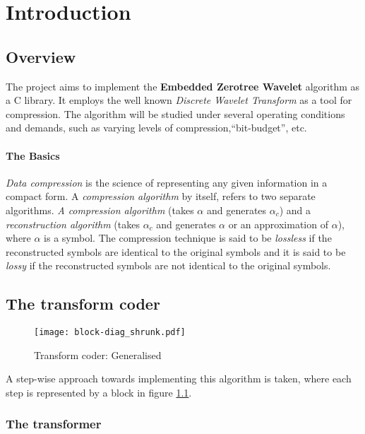 \documentclass[./A14_Report.tex]{subfiles}
\begin{document}
\chapter{Introduction}
\section{Overview}
\label{sec:overview}

The project aims to implement the \textbf{Embedded Zerotree Wavelet} algorithm
as a C library. It employs the well known \textit{Discrete Wavelet Transform}
as a tool for compression. The algorithm will be studied under several
operating conditions and demands, such as varying levels of
compression,``bit-budget'', etc.

\subsubsection{The Basics}%
\label{sec:the_basics}

\textit{Data compression} is the science of representing any given information
in a compact form. A \textit{compression algorithm} by itself, refers to two
separate algorithms. \textit{A compression algorithm} (takes $\alpha$ and
generates $\alpha_c$) and a \textit{reconstruction algorithm} (takes $\alpha_c$
and generates $\alpha$ or an approximation of $\alpha$), where $\alpha$ is a
symbol. The compression technique is said to be \textit{lossless} if the
reconstructed symbols are identical to the original symbols and it is said to
be \textit{lossy} if the  reconstructed symbols are not identical to the
original symbols.

\section{The transform coder}
\label{sec:the_transform_coder}

\begin{figure}[h]
    \centering
    \texttt{[image: block-diag\_shrunk.pdf]}
    \caption{Transform coder: Generalised \cite{shap1993}}
    \label{fig:tcoder}
\end{figure}

A step-wise approach towards implementing this algorithm is taken, where each
step is represented by a block in figure \ref{fig:tcoder}.

\pagebreak

\subsection{The transformer}
\label{sec:the_transformer}
\end{document}
